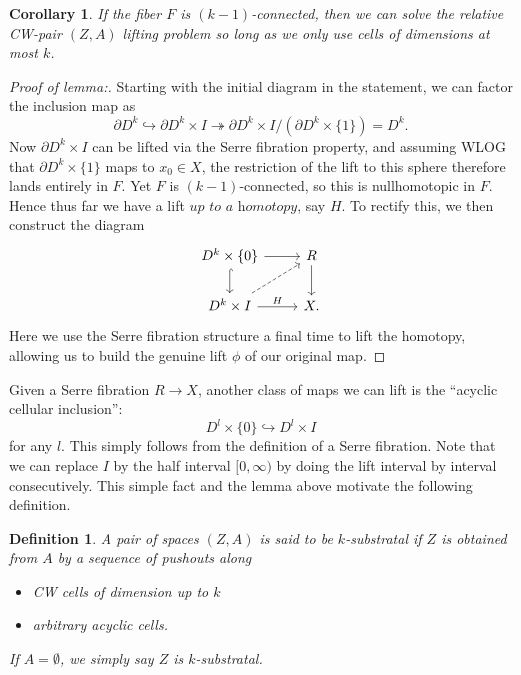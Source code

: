 \documentclass{article}
\newtheorem{corollary}[theorem]{Corollary}
\newtheorem{definition}[theorem]{Definition}
\newtheorem{proposed work}[theorem]{Proposed Work}
\begin{document}
\begin{corollary}
\label{lifting_cor}
If the fiber $F$ is $(k-1)$-connected, then we can solve the relative CW-pair $(Z,A)$ lifting problem so long as we only use cells of dimensions at most $k$.
\end{corollary}

\begin{proof}[Proof of lemma:]
Starting with the initial diagram in the statement, we can factor the inclusion map as
\begin{equation*}
\partial D^k \hookrightarrow \partial D^k \times I \twoheadrightarrow \partial D^k \times I/(\partial D^k \times \{1\}) = D^k.
\end{equation*}
Now $\partial D^k \times I$ can be lifted via the Serre fibration property, and assuming WLOG that $\partial D^k \times \{1\}$ maps to $x_0 \in X$, the restriction of the lift to this sphere therefore lands entirely in $F$. Yet $F$ is $(k-1)$-connected, so this is nullhomotopic in $F$. Hence thus far we have a lift $\textit{up to a homotopy}$, say $H$. To rectify this, we then construct the diagram
\[
\begin{tikzcd}
D^k \times \{0\} \arrow[r] \arrow[hookrightarrow]{d}
& R \arrow[d]
\\
D^k \times I \arrow[r,"H"] \arrow[dashed,ur]
& X.
\end{tikzcd}
\]
Here we use the Serre fibration structure a final time to lift the homotopy, allowing us to build the genuine lift $\phi$ of our original map.
\end{proof}


Given a Serre fibration $R \to X$, another class of maps we can lift is the ``acyclic cellular inclusion'':
\begin{equation*}
D^l\times\{0\} \hookrightarrow D^l\times I
\end{equation*}
for any $l$. This simply follows from the definition of a Serre fibration. Note that we can replace $I$ by the half interval $[0,\infty)$ by doing the lift interval by interval consecutively. This simple fact and the lemma above motivate the following definition.

\begin{definition}
A pair of spaces $(Z,A)$ is said to be $k$-substratal if $Z$ is obtained from $A$ by a sequence of pushouts along
\begin{itemize}
\item CW cells of dimension up to $k$
\item arbitrary acyclic cells.
\end{itemize}
If $A=\emptyset$, we simply say $Z$ is $k$-substratal.
\end{definition}
\end{document}
